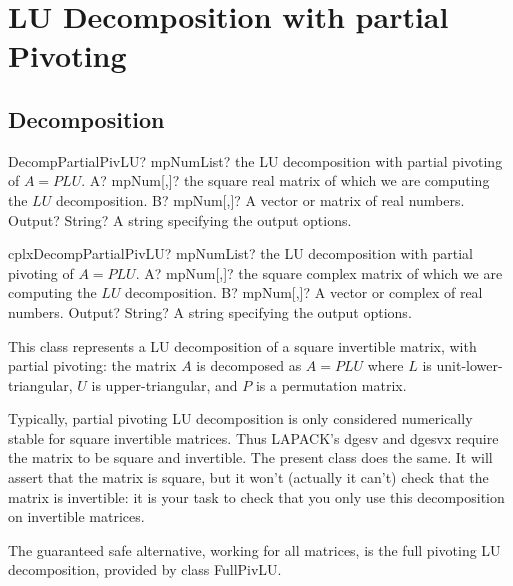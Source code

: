 \newpage
\section{LU Decomposition with partial Pivoting}
\label{LU Decomposition with partial Pivoting}

\subsection{Decomposition}

\begin{mpFunctionsExtract}
	\mpFunctionThree
	{DecompPartialPivLU? mpNumList? the LU decomposition with partial pivoting of $A = PLU$.}
	{A? mpNum[,]? the square real matrix of which we are computing the $LU$ decomposition.}
	{B? mpNum[,]? A vector or matrix of real numbers.}
	{Output? String? A string specifying the output options.}
\end{mpFunctionsExtract}

\vspace{0.6cm}
\begin{mpFunctionsExtract}
	\mpFunctionThree
	{cplxDecompPartialPivLU? mpNumList? the LU decomposition with partial pivoting of $A = PLU$.}
	{A? mpNum[,]? the square complex matrix of which we are computing the $LU$ decomposition.}
	{B? mpNum[,]? A vector or complex of real numbers.}
	{Output? String? A string specifying the output options.}
\end{mpFunctionsExtract}



\vspace{0.3cm}

This class represents a LU decomposition of a square invertible matrix, with partial pivoting: the matrix $A$ is decomposed as $A = PLU$ where $L$ is unit-lower-triangular, $U$ is upper-triangular, and $P$ is a permutation matrix.

Typically, partial pivoting LU decomposition is only considered numerically stable for square invertible matrices. Thus \textsc{LAPACK}'s \textsf{dgesv} and \textsf{dgesvx} require the matrix to be square and invertible. The present class does the same. It will assert that the matrix is square, but it won't (actually it can't) check that the matrix is invertible: it is your task to check that you only use this decomposition on invertible matrices.

The guaranteed safe alternative, working for all matrices, is the full pivoting LU decomposition, provided by class FullPivLU.


